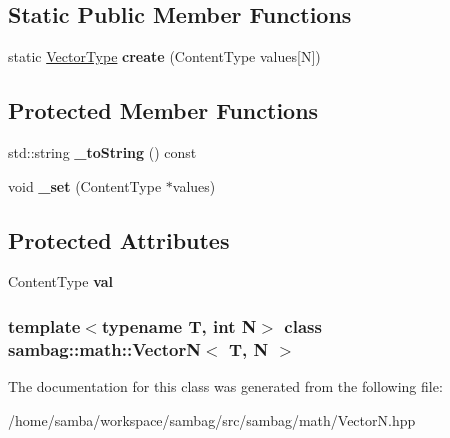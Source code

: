 \subsection*{Static Public Member Functions}
\begin{DoxyCompactItemize}
\item 
\hypertarget{classsambag_1_1math_1_1_vector_n_a9c6bc2fd69015a1dfc33b07d83d3998e}{
static \hyperlink{classsambag_1_1math_1_1_vector_n}{VectorType} {\bfseries create} (ContentType values\mbox{[}N\mbox{]})}
\label{classsambag_1_1math_1_1_vector_n_a9c6bc2fd69015a1dfc33b07d83d3998e}

\end{DoxyCompactItemize}
\subsection*{Protected Member Functions}
\begin{DoxyCompactItemize}
\item 
\hypertarget{classsambag_1_1math_1_1_vector_n_a941267fdf1daea1cee546d127a2c2078}{
std::string {\bfseries \_\-toString} () const }
\label{classsambag_1_1math_1_1_vector_n_a941267fdf1daea1cee546d127a2c2078}

\item 
\hypertarget{classsambag_1_1math_1_1_vector_n_a55a92eeac5cdda7612bffed97ac6d9c1}{
void {\bfseries \_\-set} (ContentType $\ast$values)}
\label{classsambag_1_1math_1_1_vector_n_a55a92eeac5cdda7612bffed97ac6d9c1}

\end{DoxyCompactItemize}
\subsection*{Protected Attributes}
\begin{DoxyCompactItemize}
\item 
\hypertarget{classsambag_1_1math_1_1_vector_n_af5c2c75d8daa95e93d28692bc841d23c}{
ContentType {\bfseries val}}
\label{classsambag_1_1math_1_1_vector_n_af5c2c75d8daa95e93d28692bc841d23c}

\end{DoxyCompactItemize}
\subsubsection*{template$<$typename T, int N$>$ class sambag::math::VectorN$<$ T, N $>$}



The documentation for this class was generated from the following file:\begin{DoxyCompactItemize}
\item 
/home/samba/workspace/sambag/src/sambag/math/VectorN.hpp\end{DoxyCompactItemize}
